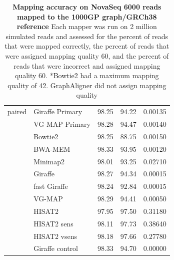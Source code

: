 \documentclass[11pt]{ucscthesis}
\begin{document}
\begin{table}[p]
\begin{tabular}{|l|l|r|r|r|}
        \hline
        paired  & Giraffe Primary	& 98.25     & 94.22     & 0.00135 \\
                & VG-MAP Primary	& 98.28     & 94.47     & 0.00140 \\
                & Bowtie2       	& 98.25     & 88.75     & 0.00150 \\
                & BWA-MEM	        & 98.33     & 93.95     & 0.00120 \\
                & Minimap2      	& 98.01     & 93.25     & 0.02710 \\
                & Giraffe	        & 98.27     & 94.34     & 0.00015 \\
                & fast Giraffe  	& 98.24     & 92.84     & 0.00015 \\
                & VG-MAP           	& 98.29     & 94.41     & 0.00050 \\
                & HISAT2        	& 97.95     & 97.50     & 0.31180 \\
                & HISAT2 sens   	& 98.11     & 97.73     & 0.38640 \\
                & HISAT2 vsens	    & 98.18     & 97.66     & 0.27780 \\
                & Giraffe control	& 98.33     & 94.70     & 0.00000 \\
 
 
        \hline
        
    \end{tabular}
    \caption[Mapping accuracy on NovaSeq 6000 reads mapped to the 1000GP graph/GRCh38 reference]{\textbf{Mapping accuracy on NovaSeq 6000 reads mapped to the 1000GP graph/GRCh38 reference} Each mapper was run on 2 million simulated reads and assessed for the percent of reads that were mapped correctly, the percent of reads that were assigned mapping quality 60, and the percent of reads that were incorrect and assigned mapping quality 60. *Bowtie2 had a maximum mapping quality of 42. GraphAligner did not assign mapping quality}
    \label{tab:mapping_accuracy_1kg_novaseq6000}
    \label{tab:first}
\end{table}
\end{document}
